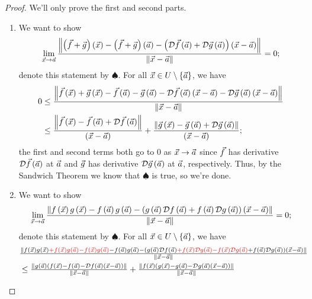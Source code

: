 \documentclass[main.tex]{subfiles}
\begin{document}
\begin{proof}
    We'll only prove the first and second parts.
    \begin{enumerate}
        \item We want to show
        \[\lim_{\vec{x}\to \vec{a}} \frac{\left\lVert \left( \vec{f} + \vec{g} \right)\left( \vec{x} \right) - \left( \vec{f} + \vec{g} \right)\left( \vec{a} \right) - \left( \mathcal{D}\vec{f}\left( \vec{a} \right) + \mathcal{D}\vec{g}\left( \vec{a} \right) \right)\left( \vec{x} - \vec{a} \right) \right\rVert}{\left\lVert \vec{x} - \vec{a} \right\rVert} = 0;\]
        denote this statement by $\spadesuit$. For all $\vec{x}\in U\setminus \left\{ \vec{a} \right\}$, we have
        \begin{align*}
            0 &\le \frac{\left\lVert \vec{f}\left( \vec{x} \right) + \vec{g}\left( \vec{x} \right) - \vec{f}\left( \vec{a} \right) - \vec{g}\left( \vec{a} \right) - \mathcal{D}\vec{f}\left( \vec{a} \right)\left( \vec{x} - \vec{a} \right) - \mathcal{D}\vec{g}\left( \vec{a} \right)\left( \vec{x} - \vec{a} \right) \right\rVert}{\left\lVert \vec{x} - \vec{a} \right\rVert} \\
            &\le \frac{\left\lVert \vec{f}\left( \vec{x} \right) - \vec{f}\left( \vec{a} \right) + \mathcal{D}\vec{f}\left( \vec{a} \right) \right\rVert}{\left( \vec{x} - \vec{a} \right)} + \frac{\left\lVert \vec{g}\left( \vec{x} \right) - \vec{g}\left( \vec{a} \right) + \mathcal{D}\vec{g}\left( \vec{a} \right) \right\rVert}{\left( \vec{x} - \vec{a} \right)};
        \end{align*}
        the first and second terms both go to $0$ as $\vec{x} \to \vec{a}$ since $\vec{f}$ has derivative $\mathcal{D}\vec{f}\left( \vec{a} \right)$ at $\vec{a}$ and $\vec{g}$ has derivative $\mathcal{D}\vec{g}\left( \vec{a} \right)$ at $\vec{a}$, respectively. Thus, by the Sandwich Theorem we know that $\spadesuit$ is true, so we're done.
        \item We want to show 
        \[\lim_{\vec{x}\to \vec{a}} \frac{\left\lVert f\left( \vec{x} \right)g\left( \vec{x} \right) - f\left( \vec{a} \right)g\left( \vec{a} \right) - \left( g\left( \vec{a} \right)\mathcal{D}f\left( \vec{a} \right) + f\left( \vec{a} \right)\mathcal{D}g\left( \vec{a} \right) \right)\left( \vec{x} - \vec{a} \right) \right\rVert}{\left\lVert \vec{x} - \vec{a} \right\rVert} = 0;\]
        denote this statement by $\spadesuit$. For all $\vec{x}\in U \setminus \left\{ \vec{a} \right\}$, we have
        \begin{align*}
            &\tfrac{\norm{f\parens{\vx}g\parens{\vx} \begingroup\color{red}+ f\parens{\vx}g\parens{\va} - f\parens{\vx}g\parens{\va}\endgroup - f\parens{\va}g\parens{\va} - \parens{g\parens{\va}\mathcal{D}f\parens{\va} \begingroup\color{red}+ f\parens{\vx}\mathcal{D}g\parens{\va} - f\parens{\vx}\mathcal{D}g\parens{\va}\endgroup + f\parens{\va}\mathcal{D}g\parens{\va}}\parens{\vx - \va}}}{\norm{\vx - \va}} \\
            &\le \tfrac{\norm{g\parens{\va}\parens{f\parens{\vx} - f\parens{\va} - \mathcal{D}f\parens{\va}\parens{\vx - \va}}}}{\norm{\vx - \va}} + \tfrac{\norm{f\parens{\vx}\parens{g\parens{\vx} - g\parens{\va} - \mathcal{D}g\parens{\va}\parens{\vx - \va}}}}{\norm{\vx - \va}}\\

\end{align*}
\end{enumerate}
\end{proof}
\end{document}
